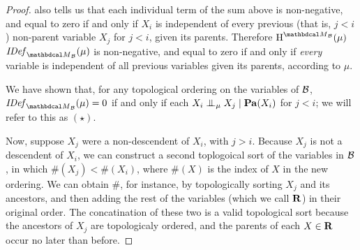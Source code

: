 \begin{proof}
 also
tells us that each individual term of 
the sum above
is non-negative, and equal to zero if and only if $X_i$ is independent of every previous (that is, $j < i$) non-parent variable $X_j$ for $j < i$, given its parents. 	
Therefore 
$\H^{\PDGof{\mathcal B}}(\mu)$
$\IDef{\PDGof{\mathcal B}}(\mu)$
is non-negative, and equal to zero if and only if \emph{every} variable is independent of all previous variables given its parents, according to $\mu$. 
	
	

We have shown that, for any topological ordering on
the variables of $\cal B$, $\IDef{\PDGof{\cal B}}(\mu) =
 0$ if and only if  each $X_i \mathrel{\perp\mspace{-10mu}\perp}_\mu
X_j \mid \mathbf{Pa}(X_i)$ for $j  < i$; we will refer to this
as $(\star)$. 
	
	Now, suppose $X_j$ were a non-descendent of $X_i$, with $j > i$. Because $X_j$ is not a descendent of $X_i$, we can construct a second toplogoical sort of the variables in $\cal B$, in which $\#(X_j) < \#(X_i)$, where $\#(X)$ is the index of $X$ in the new ordering. 
	We can obtain $\#$, for instance, by topologically sorting $X_j$ and its ancestors, and then adding the rest of the variables (which we call $\bf R$) in their original order. The concatination of these two is a valid topological sort because the ancestors of $X_j$ are topologicaly ordered, and the parents of each $X \in \bf R$ occur no later than before.
	

\end{proof}
